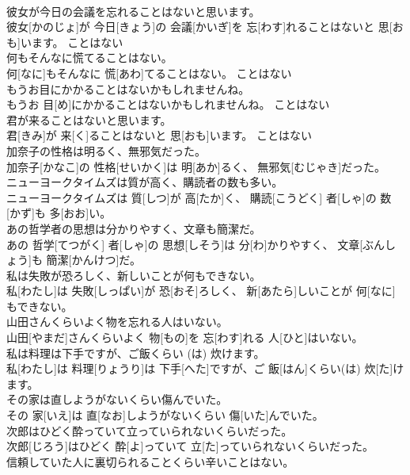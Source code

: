 \documentclass[8pt]{extreport}
\begin{document}
\begin{CJK}{UTF8}{min}
\\	彼女が今日の会議を忘れることはないと思います。	
\\	彼女[かのじょ]が 今日[きょう]の 会議[かいぎ]を 忘[わす]れることはないと 思[おも]います。	ことはない 
\\	何もそんなに慌てることはない。	
\\	何[なに]もそんなに 慌[あわ]てることはない。	ことはない 
\\	もうお目にかかることはないかもしれませんね。	
\\	もうお 目[め]にかかることはないかもしれませんね。	ことはない 
\\	君が来ることはないと思います。	
\\	君[きみ]が 来[く]ることはないと 思[おも]います。	ことはない 
\\	加奈子の性格は明るく、無邪気だった。	
\\	加奈子[かなこ]の 性格[せいかく]は 明[あか]るく、 無邪気[むじゃき]だった。	
\\	ニューヨークタイムズは質が高く、購読者の数も多い。	
\\	ニューヨークタイムズは 質[しつ]が 高[たか]く、 購読[こうどく] 者[しゃ]の 数[かず]も 多[おお]い。	
\\	あの哲学者の思想は分かりやすく、文章も簡潔だ。	
\\	あの 哲学[てつがく] 者[しゃ]の 思想[しそう]は 分[わ]かりやすく、 文章[ぶんしょう]も 簡潔[かんけつ]だ。	
\\	私は失敗が恐ろしく、新しいことが何もできない。	
\\	私[わたし]は 失敗[しっぱい]が 恐[おそ]ろしく、 新[あたら]しいことが 何[なに]もできない。	
\\	山田さんくらいよく物を忘れる人はいない。	
\\	山田[やまだ]さんくらいよく 物[もの]を 忘[わす]れる 人[ひと]はいない。	
\\	私は料理は下手ですが、ご飯くらい (は) 炊けます。	
\\	私[わたし]は 料理[りょうり]は 下手[へた]ですが、ご 飯[はん]くらい(は) 炊[た]けます。	
\\	その家は直しようがないくらい傷んでいた。	
\\	その 家[いえ]は 直[なお]しようがないくらい 傷[いた]んでいた。	
\\	次郎はひどく酔っていて立っていられないくらいだった。	
\\	次郎[じろう]はひどく 酔[よ]っていて 立[た]っていられないくらいだった。	
\\	信頼していた人に裏切られることくらい辛いことはない。	

\end{CJK}
\end{document}
